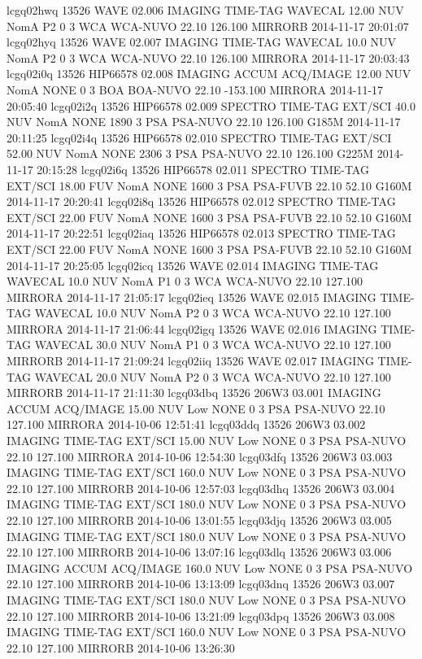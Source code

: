 lcgq02hwq 13526 WAVE 02.006 IMAGING TIME-TAG WAVECAL 12.00 NUV NomA P2 0 3 WCA WCA-NUVO 22.10 126.100 MIRRORB 2014-11-17 20:01:07
lcgq02hyq 13526 WAVE 02.007 IMAGING TIME-TAG WAVECAL 10.0 NUV NomA P2 0 3 WCA WCA-NUVO 22.10 126.100 MIRRORA 2014-11-17 20:03:43
lcgq02i0q 13526 HIP66578 02.008 IMAGING ACCUM ACQ/IMAGE 12.00 NUV NomA NONE 0 3 BOA BOA-NUVO 22.10 -153.100 MIRRORA 2014-11-17 20:05:40
lcgq02i2q 13526 HIP66578 02.009 SPECTRO TIME-TAG EXT/SCI 40.0 NUV NomA NONE 1890 3 PSA PSA-NUVO 22.10 126.100 G185M 2014-11-17 20:11:25
lcgq02i4q 13526 HIP66578 02.010 SPECTRO TIME-TAG EXT/SCI 52.00 NUV NomA NONE 2306 3 PSA PSA-NUVO 22.10 126.100 G225M 2014-11-17 20:15:28
lcgq02i6q 13526 HIP66578 02.011 SPECTRO TIME-TAG EXT/SCI 18.00 FUV NomA NONE 1600 3 PSA PSA-FUVB 22.10 52.10 G160M 2014-11-17 20:20:41
lcgq02i8q 13526 HIP66578 02.012 SPECTRO TIME-TAG EXT/SCI 22.00 FUV NomA NONE 1600 3 PSA PSA-FUVB 22.10 52.10 G160M 2014-11-17 20:22:51
lcgq02iaq 13526 HIP66578 02.013 SPECTRO TIME-TAG EXT/SCI 22.00 FUV NomA NONE 1600 3 PSA PSA-FUVB 22.10 52.10 G160M 2014-11-17 20:25:05
lcgq02icq 13526 WAVE 02.014 IMAGING TIME-TAG WAVECAL 10.0 NUV NomA P1 0 3 WCA WCA-NUVO 22.10 127.100 MIRRORA 2014-11-17 21:05:17
lcgq02ieq 13526 WAVE 02.015 IMAGING TIME-TAG WAVECAL 10.0 NUV NomA P2 0 3 WCA WCA-NUVO 22.10 127.100 MIRRORA 2014-11-17 21:06:44
lcgq02igq 13526 WAVE 02.016 IMAGING TIME-TAG WAVECAL 30.0 NUV NomA P1 0 3 WCA WCA-NUVO 22.10 127.100 MIRRORB 2014-11-17 21:09:24
lcgq02iiq 13526 WAVE 02.017 IMAGING TIME-TAG WAVECAL 20.0 NUV NomA P2 0 3 WCA WCA-NUVO 22.10 127.100 MIRRORB 2014-11-17 21:11:30
lcgq03dbq 13526 206W3 03.001 IMAGING ACCUM ACQ/IMAGE 15.00 NUV Low NONE 0 3 PSA PSA-NUVO 22.10 127.100 MIRRORA 2014-10-06 12:51:41
lcgq03ddq 13526 206W3 03.002 IMAGING TIME-TAG EXT/SCI 15.00 NUV Low NONE 0 3 PSA PSA-NUVO 22.10 127.100 MIRRORA 2014-10-06 12:54:30
lcgq03dfq 13526 206W3 03.003 IMAGING TIME-TAG EXT/SCI 160.0 NUV Low NONE 0 3 PSA PSA-NUVO 22.10 127.100 MIRRORB 2014-10-06 12:57:03
lcgq03dhq 13526 206W3 03.004 IMAGING TIME-TAG EXT/SCI 180.0 NUV Low NONE 0 3 PSA PSA-NUVO 22.10 127.100 MIRRORB 2014-10-06 13:01:55
lcgq03djq 13526 206W3 03.005 IMAGING TIME-TAG EXT/SCI 180.0 NUV Low NONE 0 3 PSA PSA-NUVO 22.10 127.100 MIRRORB 2014-10-06 13:07:16
lcgq03dlq 13526 206W3 03.006 IMAGING ACCUM ACQ/IMAGE 160.0 NUV Low NONE 0 3 PSA PSA-NUVO 22.10 127.100 MIRRORB 2014-10-06 13:13:09
lcgq03dnq 13526 206W3 03.007 IMAGING TIME-TAG EXT/SCI 180.0 NUV Low NONE 0 3 PSA PSA-NUVO 22.10 127.100 MIRRORB 2014-10-06 13:21:09
lcgq03dpq 13526 206W3 03.008 IMAGING TIME-TAG EXT/SCI 160.0 NUV Low NONE 0 3 PSA PSA-NUVO 22.10 127.100 MIRRORB 2014-10-06 13:26:30
